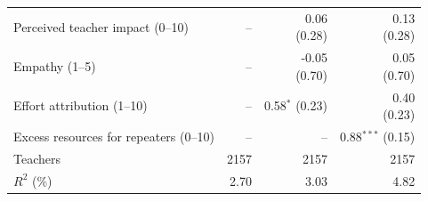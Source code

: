 \begin{tabular}{p{5.6cm}rrr}
Perceived teacher impact (0--10) & -- & \shortstack{0.06\\{\scriptsize (0.28)}} & \shortstack{0.13\\{\scriptsize (0.28)}} \\
Empathy (1--5) & -- & \shortstack{-0.05\\{\scriptsize (0.70)}} & \shortstack{0.05\\{\scriptsize (0.70)}} \\
Effort attribution (1--10) & -- & \shortstack{0.58$^{*}$\\{\scriptsize (0.23)}} & \shortstack{0.40\\{\scriptsize (0.23)}} \\
Excess resources for repeaters (0--10) & -- & -- & \shortstack{0.88$^{***}$\\{\scriptsize (0.15)}} \\
Teachers & 2157 & 2157 & 2157 \\
$R^2$ (\%) & 2.70 & 3.03 & 4.82 \\
\bottomrule
\end{tabular}
